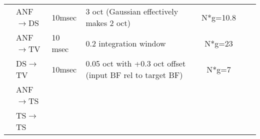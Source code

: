 \begin{longtable}{cXXXXXXX}
           {\citep{ReissYoung:2005}}             & {ANF\ensuremath{\rightarrow}DS} &                                                      {10msec}                                                      &        {3 oct (Gaussian effectively makes 2 oct)}         &                                                \multicolumn{2}{c}{N*g=10.8}                                                 &                    {}                     & \\ 
                                                 &  ANF\ensuremath{\rightarrow}TV  &                                                      10 msec                                                       &                  0.2 integration window                   &                                                 \multicolumn{2}{c}{N*g=23}                                                  &                                           & \\ 
                                                 &  DS\ensuremath{\rightarrow}TV   &                                                       10msec                                                       & 0.05 oct with +0.3 oct offset (input BF rel to target BF) &                                                  \multicolumn{2}{c}{N*g=7}                                                  &                                           & \\ \midrule


          \citep{WiegrebeMeddis:2004}            &  ANF\ensuremath{\rightarrow}TS  &                                                                                                                    &                                                           &                                           &                                                                                 &                                           & \\ 
                                                 &  TS\ensuremath{\rightarrow}TS   &                                                                                                                    &                                                           &                                           &                                                                                 &                                           & \\ \midrule



\end{longtable}
